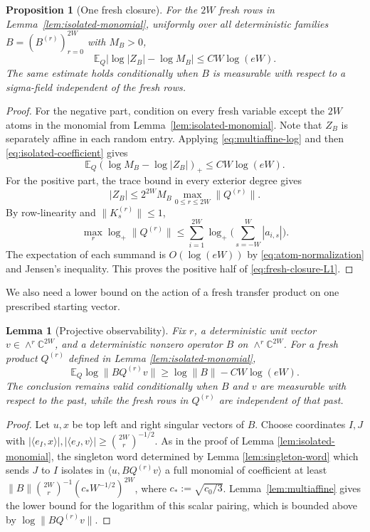 \documentclass[11pt,reqno]{amsart}
\numberwithin{equation}{section}
\newtheorem{proposition}[theorem]{Proposition}
\newtheorem{lemma}[theorem]{Lemma}
\theoremstyle{definition}
\theoremstyle{remark}
\newcommand{\C}{\mathbb C}
\newcommand{\E}{\mathbb E}
\newcommand{\1}{\mathbf 1}
\begin{document}
\begin{proposition}[One fresh closure]\label{prop:fresh-closure}
For the $2W$ fresh rows in Lemma~\ref{lem:isolated-monomial}, uniformly over
all deterministic families $B=(B^{(r)})_{r=0}^{2W}$ with $M_B>0$,
\begin{equation}\label{eq:fresh-closure-L1}
 \E_Q\left|\log|Z_B|-\log M_B\right|
 \le C W\log(eW).
\end{equation}
The same estimate holds conditionally when $B$ is measurable with respect to
a sigma-field independent of the fresh rows.
\end{proposition}

\begin{proof}
For the negative part, condition on every fresh variable except the $2W$
atoms in the monomial from Lemma~\ref{lem:isolated-monomial}. Note that $Z_B$ is separately affine in each random entry. Applying
\eqref{eq:multiaffine-log} and then
\eqref{eq:isolated-coefficient} gives
\[
 \E_Q(\log M_B-\log|Z_B|)_+\le CW\log(eW).
\]
For the positive part, the trace bound in every exterior degree gives
\[
 |Z_B|\le2^{2W}M_B\max_{0\le r\le2W}\|Q^{(r)}\|.
\]
By row-linearity and \(\|K_s^{(r)}\|\le1\),
\[
 \max_r\log_+\|Q^{(r)}\|
 \le\sum_{i=1}^{2W}\log_+\Big(\sum_{s=-W}^W|a_{i,s}|\Big).
\]
The expectation of each summand is $O(\log(eW))$ by
\eqref{eq:atom-normalization} and Jensen's inequality.  This proves the
positive half of \eqref{eq:fresh-closure-L1}.
\end{proof}

We also need a lower bound on the action of a fresh transfer product on one
prescribed starting vector.

\begin{lemma}[Projective observability]\label{lem:projective}
Fix $r$, a deterministic unit vector $v\in\wedge^r\C^{2W}$, and a
deterministic nonzero operator $B$ on $\wedge^r\C^{2W}$.  For a fresh
product $Q^{(r)}$ defined in Lemma \ref{lem:isolated-monomial},
\begin{equation}\label{eq:projective}
 \E_Q\log\|BQ^{(r)}v\|\ge\log\|B\|-CW\log(eW).
\end{equation}
The conclusion remains valid conditionally when $B$ and $v$ are measurable
with respect to the past, while the fresh rows in $Q^{(r)}$ are independent of that past.
\end{lemma}

\begin{proof}
Let $u,x$ be top left and right singular vectors of $B$.  Choose coordinates
$I,J$ with
$|\langle e_I,x\rangle|,|\langle e_J,v\rangle|
\ge\binom{2W}{r}^{-1/2}$.
As in the proof of Lemma \ref{lem:isolated-monomial}, the singleton word determined by Lemma \ref{lem:singleton-word} which sends $J$ to $I$ isolates in
$\langle u,BQ^{(r)}v\rangle$ a full monomial of coefficient at least
$\|B\|\binom{2W}{r}^{-1}(c_*W^{-1/2})^{2W}$, where
$c_*:=\sqrt{c_0/3}$.
Lemma~\ref{lem:multiaffine} gives the
lower bound for the logarithm of this scalar pairing, which is bounded
above by $\log\|BQ^{(r)}v\|$.
\end{proof}
\end{document}
